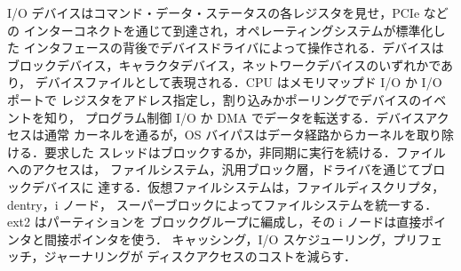 \documentclass[../main.tex]{subfiles}
\begin{document}
\begin{keypoint}[章のまとめ]
  I/O デバイスはコマンド・データ・ステータスの各レジスタを見せ，PCIe などの
  インターコネクトを通じて到達され，オペレーティングシステムが標準化した
  インタフェースの背後でデバイスドライバによって操作される．デバイスは
  ブロックデバイス，キャラクタデバイス，ネットワークデバイスのいずれかであり，
  デバイスファイルとして表現される．CPU はメモリマップド I/O か I/O ポートで
  レジスタをアドレス指定し，割り込みかポーリングでデバイスのイベントを知り，
  プログラム制御 I/O か DMA でデータを転送する．デバイスアクセスは通常
  カーネルを通るが，OS バイパスはデータ経路からカーネルを取り除ける．要求した
  スレッドはブロックするか，非同期に実行を続ける．ファイルへのアクセスは，
  ファイルシステム，汎用ブロック層，ドライバを通じてブロックデバイスに
  達する．仮想ファイルシステムは，ファイルディスクリプタ，dentry，i ノード，
  スーパーブロックによってファイルシステムを統一する．ext2 はパーティションを
  ブロックグループに編成し，その i ノードは直接ポインタと間接ポインタを使う．
  キャッシング，I/O スケジューリング，プリフェッチ，ジャーナリングが
  ディスクアクセスのコストを減らす．
\end{keypoint}
\end{document}

